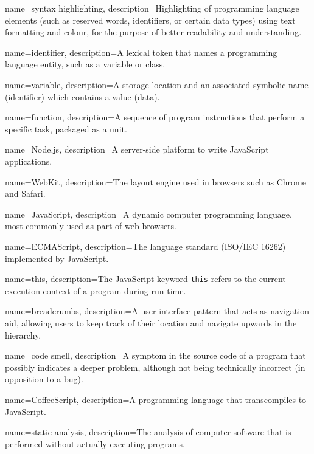 
{
	name=syntax highlighting,
	description={Highlighting of programming language elements (such as reserved words, identifiers, or certain data types) using text formatting and colour, for the purpose of better readability and understanding.}
}

{
	name=identifier,
	description={A lexical token that names a programming language entity, such as a variable or class.}
}

{
	name=variable,
	description={A storage location and an associated symbolic name (identifier) which contains a value (data).}
}

{
	name=function,
	description={A sequence of program instructions that perform a specific task, packaged as a unit.}
}

{
	name=Node.js,
	description={A server-side platform to write JavaScript applications.}
}

{
	name=WebKit,
	description={The layout engine used in browsers such as Chrome and Safari.}
}

{
	name=JavaScript,
	description={A dynamic computer programming language, most commonly used as part of web browsers.}
}

{
	name=ECMAScript,
	description={The language standard (ISO/IEC 16262) implemented by JavaScript.}
}

{
	name=this,
	description={The JavaScript keyword \texttt{this} refers to the current execution context of a program during run-time.}
}

{
	name=breadcrumbs,
	description={A user interface pattern that acts as navigation aid, allowing users to keep track of their location and navigate upwards in the hierarchy.}
}

{
	name=code smell,
	description={A symptom in the source code of a program that possibly indicates a deeper problem, although not being technically incorrect (in opposition to a bug).}
}

{
	name=CoffeeScript,
	description={A programming language that transcompiles to JavaScript.}
}

{
	name=static analysis,
	description={The analysis of computer software that is performed without actually executing programs.}
}
